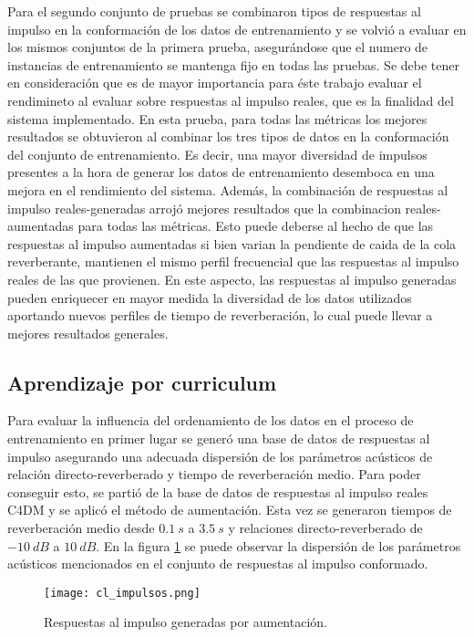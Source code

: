 Para el segundo conjunto de pruebas se combinaron tipos de respuestas al impulso en la conformación de los datos de entrenamiento y se volvió a evaluar en los mismos conjuntos de la primera prueba, asegurándose que el numero de instancias de entrenamiento se mantenga fijo en todas las pruebas. Se debe tener en consideración que es de mayor importancia para éste trabajo evaluar el rendimineto al evaluar sobre respuestas al impulso reales, que es la finalidad del sistema implementado. En esta prueba, para todas las métricas los mejores resultados se obtuvieron al combinar los tres tipos de datos en la conformación del conjunto de entrenamiento. Es decir, una mayor diversidad de impulsos presentes a la hora de generar los datos de entrenamiento desemboca en una mejora en el rendimiento del sistema. Además, la combinación de respuestas al impulso reales-generadas arrojó mejores resultados que la combinacion reales-aumentadas para todas las métricas. Esto puede deberse al hecho de que las respuestas al impulso aumentadas si bien varian la pendiente de caida de la cola reverberante, mantienen el mismo perfil frecuencial que las respuestas al impulso reales de las que provienen. En este aspecto, las respuestas al impulso generadas pueden enriquecer en mayor medida la diversidad de los datos utilizados aportando nuevos perfiles de tiempo de reverberación, lo cual puede llevar a mejores resultados generales. 


\subsection{Aprendizaje por curriculum}
Para evaluar la influencia del ordenamiento de los datos en el proceso de entrenamiento en primer lugar se generó una base de datos de respuestas al impulso asegurando una adecuada dispersión de los parámetros acústicos de relación directo-reverberado y tiempo de reverberación medio. Para poder conseguir esto, se partió de la base de datos de respuestas al impulso reales C4DM y se aplicó el método de aumentación. Esta vez se generaron tiempos de reverberación medio desde $0.1 \ s$ a $3.5 \ s$ y relaciones directo-reverberado de $-10 \ dB$ a $10 \ dB$. En la figura \ref{fig:cl_impulsos} se puede observar la dispersión de los parámetros acústicos mencionados en el conjunto de respuestas al impulso conformado.

\begin{figure}[H]
	\centering{}
	\texttt{[image: cl\_impulsos.png]}
	\caption{Respuestas al impulso generadas por aumentación.}
	\label{fig:cl_impulsos}
\end{figure}

